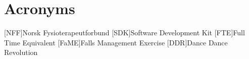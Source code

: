 \chapter*{Acronyms}
\begin{acronym}
[NFF]{Norsk Fysioterapeutforbund}
[SDK]{Software Development Kit}
[FTE]{Full Time Equivalent}
[FaME]{Falls Management Exercise}
[DDR]{Dance Dance Revolution}
\end{acronym}

